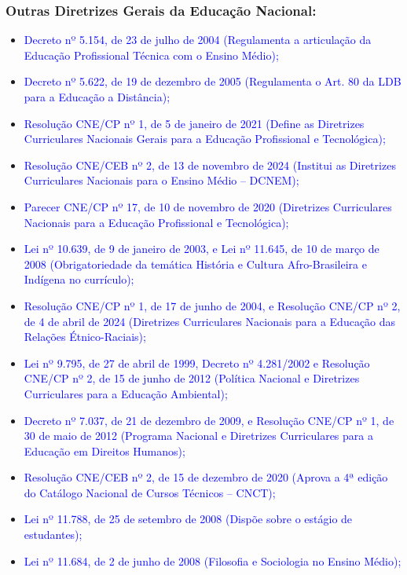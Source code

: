 \documentclass{../../modelos/latex-shared/ifsc-ppc}
\newcommand{\revisao}[1]{\textcolor{blue}{#1}}
\newcommand{\revisao}[1]{#1}
\begin{document}
\subsubsection{Outras Diretrizes Gerais da Educação Nacional:}
\begin{itemize}
    \item \revisao{Decreto nº 5.154, de 23 de julho de 2004 (Regulamenta a articulação da Educação Profissional Técnica com o Ensino Médio);}
    \item \revisao{Decreto nº 5.622, de 19 de dezembro de 2005 (Regulamenta o Art. 80 da LDB para a Educação a Distância);}
    \item \revisao{Resolução CNE/CP nº 1, de 5 de janeiro de 2021 (Define as Diretrizes Curriculares Nacionais Gerais para a Educação Profissional e Tecnológica);}
    \item \revisao{Resolução CNE/CEB nº 2, de 13 de novembro de 2024 (Institui as Diretrizes Curriculares Nacionais para o Ensino Médio -- DCNEM);}
    \item \revisao{Parecer CNE/CP nº 17, de 10 de novembro de 2020 (Diretrizes Curriculares Nacionais para a Educação Profissional e Tecnológica);}
    \item \revisao{Lei nº 10.639, de 9 de janeiro de 2003, e Lei nº 11.645, de 10 de março de 2008 (Obrigatoriedade da temática História e Cultura Afro-Brasileira e Indígena no currículo);}
    \item \revisao{Resolução CNE/CP nº 1, de 17 de junho de 2004, e Resolução CNE/CP nº 2, de 4 de abril de 2024 (Diretrizes Curriculares Nacionais para a Educação das Relações Étnico-Raciais);}
    \item \revisao{Lei nº 9.795, de 27 de abril de 1999, Decreto nº 4.281/2002 e Resolução CNE/CP nº 2, de 15 de junho de 2012 (Política Nacional e Diretrizes Curriculares para a Educação Ambiental);}
    \item \revisao{Decreto nº 7.037, de 21 de dezembro de 2009, e Resolução CNE/CP nº 1, de 30 de maio de 2012 (Programa Nacional e Diretrizes Curriculares para a Educação em Direitos Humanos);}
    \item \revisao{Resolução CNE/CEB nº 2, de 15 de dezembro de 2020 (Aprova a 4ª edição do Catálogo Nacional de Cursos Técnicos -- CNCT);}
    \item \revisao{Lei nº 11.788, de 25 de setembro de 2008 (Dispõe sobre o estágio de estudantes);}
    \item \revisao{Lei nº 11.684, de 2 de junho de 2008 (Filosofia e Sociologia no Ensino Médio);}

\end{itemize}
\end{document}
